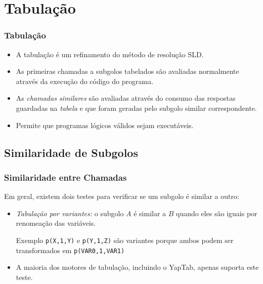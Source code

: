 \documentclass{beamer}
\begin{document}
\section{Tabulação}

\begin{frame}
    \frametitle{Tabulação}
    \begin{itemize}
       \item A tabulação é um refinamento do método de resolução SLD.
       \item As primeiras chamadas a subgolos tabelados são avaliadas normalmente através da execução do código do
       programa.
       \item As \emph{chamadas similares} são avaliadas através do consumo das respostas guardadas na \emph{tabela}
       e que foram geradas pelo subgolo similar correspondente.
       \item Permite que programas lógicos válidos sejam executáveis.
    \end{itemize}
\end{frame}

\subsection{Similaridade de Subgolos}

\begin{frame}
   \frametitle{Similaridade entre Chamadas}
   Em geral, existem dois testes para verificar se um subgolo é similar a outro:
   \begin{itemize}
      \item \emph{Tabulação por variantes:} o subgolo $A$ é similar a $B$ quando eles são iguais por renomeação das variáveis.
      \pause
      \begin{block}{Exemplo}
         \texttt{p(X,1,Y)} e \texttt{p(Y,1,Z)} são variantes porque ambos podem ser transformados em \texttt{p(VAR0,1,VAR1)}
      \end{block}
      \pause
      \item A maioria dos motores de tabulação, incluindo o YapTab, apenas suporta este teste.
   \end{itemize}
\end{frame}
\end{document}
